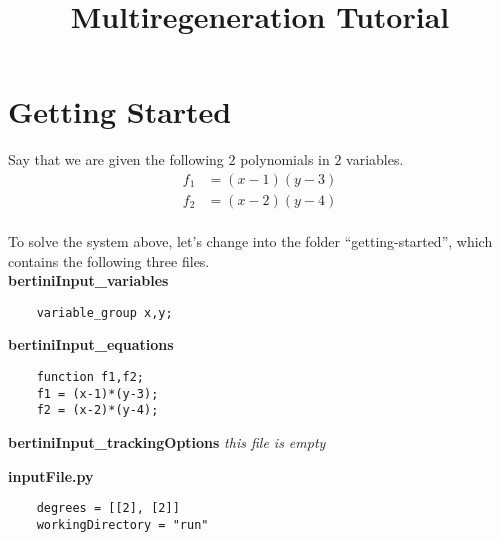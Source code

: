 \documentclass[12pt]{article}
\title{\large \bf
Multiregeneration Tutorial
}
\author{}
\newcommand{\C}{\mathbb{C}}
\begin{document}
\maketitle
\section{Getting Started}
Say that we are given the following $2$ polynomials
in $2$ variables. 
\begin{align*}
    f_1 &= (x-1)(y-3)\\
    f_2 &= (x-2)(y-4)\\
\end{align*}


\noindent To solve the system above, let's change into the folder 
``getting-started'', which contains the following three files.\\

\noindent \textbf{bertiniInput\_variables}


\begin{leftbar}
\vspace{-10pt} 
\begin{verbatim}
    variable_group x,y; 
\end{verbatim}\vspace{-10pt} 
\end{leftbar}

\noindent \textbf{bertiniInput\_equations}


\begin{leftbar}
\vspace{-10pt} 
\begin{verbatim}
    function f1,f2;
    f1 = (x-1)*(y-3);
    f2 = (x-2)*(y-4);
\end{verbatim}\vspace{-10pt} 
\end{leftbar}

\noindent \textbf{bertiniInput\_trackingOptions}
\emph{this file is empty}

\noindent \textbf{inputFile.py}

\begin{leftbar}
\vspace{-10pt} 
\begin{verbatim}
    degrees = [[2], [2]]
    workingDirectory = "run"
\end{verbatim}\vspace{-10pt} 
\end{leftbar}
\end{document}
